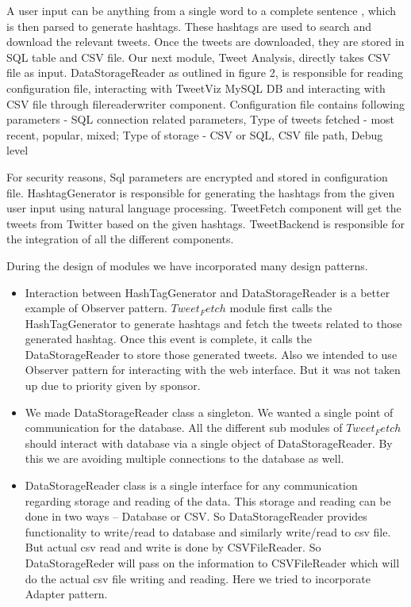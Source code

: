 \documentclass[11pt]{article}
\begin{document}
A user input can be anything from a single word to a complete sentence , which is then parsed to generate hashtags. These hashtags are used to search and download the relevant tweets. Once the tweets are downloaded, they are stored in SQL table and CSV file. Our next module, Tweet Analysis, directly takes CSV file as input. 
DataStorageReader as outlined in figure 2, is responsible for reading configuration file, interacting with TweetViz MySQL DB and interacting with CSV file through filereaderwriter component. Configuration file contains following parameters - SQL connection related parameters, Type of tweets fetched - most recent, popular, mixed; Type of storage - CSV or SQL, CSV file path, Debug level
 
For security reasons, Sql parameters are encrypted and stored in configuration file. HashtagGenerator is responsible for generating the hashtags from the given user input using natural language processing. TweetFetch component will get the tweets from Twitter based on the given hashtags. TweetBackend is responsible for the integration of all the different components. 

During the design of modules we have incorporated many design patterns.
\begin{itemize}
\item Interaction between HashTagGenerator and DataStorageReader is a better example of Observer pattern. $Tweet_Fetch$ module first calls the HashTagGenerator to generate hashtags and fetch the tweets related to those generated hashtag. Once this event is complete, it calls the DataStorageReader to store those generated tweets. Also we intended to use Observer pattern for interacting with the web interface. But it was not taken up due to priority given by sponsor.
\item We made DataStorageReader class a singleton. We wanted a single point of communication for the database. All the different sub modules of $Tweet_Fetch$ should interact with database via a single object of DataStorageReader. By this we are avoiding multiple connections to the database as well.
\item DataStorageReader class is a single interface for any communication regarding storage and reading of the data. This storage and reading can be done in two ways – Database or CSV. So DataStorageReader provides functionality to write/read to database and similarly write/read to csv file. But actual csv read and write is done by CSVFileReader. So DataStorageReder will pass on the information to CSVFileReader which will do the actual csv file writing and reading. Here we tried to incorporate Adapter pattern.
\end{itemize} 
\end{document}
